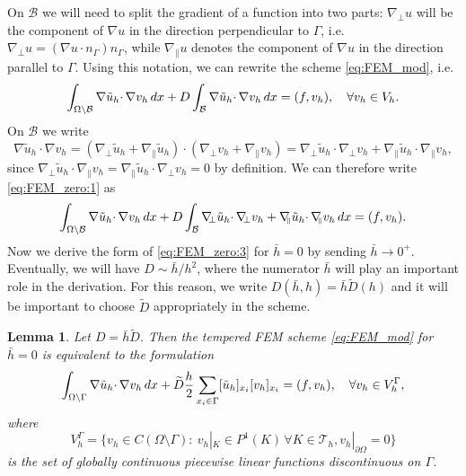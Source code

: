 \documentclass{article}
\newtheorem{lemma}{Lemma}
\theoremstyle{remark}
\def \Th {{\mathcal T}_h}
\def \d {{\rm d}}
\def\dx{\,\d x }
\def\B{\mathcal{B}}
\def\tu{\tilde{u}}
\def\gradn{\nabla_{\!\!\perp}}
\def\gradt{\nabla_{\!\!{\scriptscriptstyle\parallel}}}
\def\tD{\widetilde{D}}
\def\width{\bar{h}}
\begin{document}
On $\B$ we will need to split the gradient of a function into two parts: $\gradn u$ will be the component of $\nabla u$ in the direction perpendicular to $\Gamma$, i.e. $\gradn u=(\nabla u\cdotp n_\Gamma)n_\Gamma$, while $\gradt u$ denotes the component of $\nabla u$ in the direction parallel to $\Gamma$. Using this notation, we can rewrite the scheme \eqref{eq:FEM_mod}, i.e.
\begin{equation}
\label{eq:FEM_zero:1}
\int_{\Omega\setminus\B} \nabla \tu_h\cdotp\nabla v_h \dx +D\int_{\B} \nabla \tu_h\cdotp\nabla v_h \dx=(f,v_h),\quad\forall v_h\in V_h.
\end{equation}
On $\B$ we write
\begin{equation*}
\label{eq:FEM_zero:2}
\nabla \tu_h\cdotp\nabla v_h =(\gradn \tu_h+\gradt \tu_h)\cdot(\gradn v_h +\gradt v_h) = \gradn \tu_h \cdotp\gradn v_h +\gradt \tu_h\cdotp\gradt v_h,
\end{equation*}
since $\gradn \tu_h\cdotp\gradt v_h =\gradt \tu_h\cdotp\gradn v_h =0$ by definition. We can therefore write \eqref{eq:FEM_zero:1} as
\begin{equation}
\label{eq:FEM_zero:3}
\int_{\Omega\setminus\B} \nabla \tu_h\cdotp\nabla v_h \dx +D\int_{\B} \gradn \tu_h \cdotp\gradn v_h +\gradt \tu_h\cdotp\gradt v_h \dx=(f,v_h).
\end{equation}
Now we derive the form of \eqref{eq:FEM_zero:3} for $\width=0$ by sending $\width\to 0^+$. Eventually, we will have $D\sim\width/h^2$, where the numerator $\width$ will play an important role in the derivation. For this reason, we write $D(\width, h)=\width\tD(h)$ and it will be important to choose $\tD$ appropriately in the scheme.

\begin{lemma}
\label{lem:FEM_zero}
Let $D=\width\tD$. Then the tempered FEM scheme \eqref{eq:FEM_mod} for $\width=0$ is equivalent to the formulation
\begin{equation}
\label{eq:FEM_zero}
\int_{\Omega\setminus\Gamma} \nabla \tu_h\cdotp\nabla v_h \dx +\tD\frac{h}{2}\sum_{x_i\in\Gamma}[\tu_h]_{x_i}[v_h]_{x_i}=(f,v_h),\quad\forall v_h\in V_h^\Gamma,
\end{equation}
where
\begin{equation*}
V_h^\Gamma = \{v_h\in C(\Omega\setminus\Gamma):\ v_h|_K\in P^1(K)\,\forall K\in\Th, v_h|_{\partial\Omega}=0\}
\end{equation*}
is the set of globally continuous piecewise linear functions discontinuous on $\Gamma$.
\end{lemma}
\end{document}

